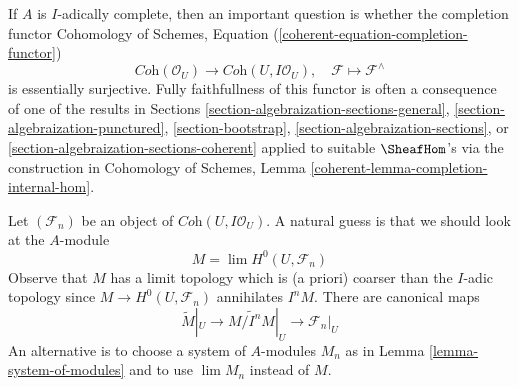 \noindent
If $A$ is $I$-adically complete, then an important question
is whether the completion functor Cohomology of Schemes,
Equation (\ref{coherent-equation-completion-functor})
$$
\textit{Coh}(\mathcal{O}_U)
\longrightarrow
\textit{Coh}(U, I\mathcal{O}_U),\quad
\mathcal{F} \longmapsto \mathcal{F}^\wedge
$$
is essentially surjective. Fully faithfullness of this functor
is often a consequence of one of the results in
Sections 
\ref{section-algebraization-sections-general},
\ref{section-algebraization-punctured},
\ref{section-bootstrap},
\ref{section-algebraization-sections}, or
\ref{section-algebraization-sections-coherent}
applied to suitable $\SheafHom$'s via the construction in
Cohomology of Schemes, Lemma \ref{coherent-lemma-completion-internal-hom}.

\medskip\noindent
Let $(\mathcal{F}_n)$ be an object of $\textit{Coh}(U, I\mathcal{O}_U)$.
A natural guess is that we should look at the $A$-module
\begin{equation}
\label{equation-guess}
M = \lim H^0(U, \mathcal{F}_n)
\end{equation}
Observe that $M$ has a limit topology which is (a priori) coarser than
the $I$-adic topology since $M \to H^0(U, \mathcal{F}_n)$ annihilates
$I^nM$. There are canonical maps
$$
\widetilde{M}|_U \to \widetilde{M/I^nM}|_U \to \mathcal{F}_n|_U
$$
An alternative is to choose a system of $A$-modules $M_n$
as in Lemma \ref{lemma-system-of-modules} and to use $\lim M_n$
instead of $M$.

